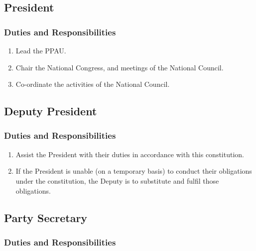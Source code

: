 \documentclass[a4paper,titlepage,8.5pt]{article}
\begin{document}
\subsection{President}

\subsubsection{Duties and Responsibilities}

\begin{enumerate}
\item Lead the PPAU.
\item Chair the National Congress, and meetings of the National Council.
\item Co-ordinate the activities of the National Council.
\end{enumerate}

\subsection{Deputy President}

\subsubsection{Duties and Responsibilities}

\begin{enumerate}
\item Assist the President with their duties in accordance with this constitution.
\item If the President is unable (on a temporary basis) to conduct their obligations under the constitution, the Deputy is to substitute and fulfil those obligations.
\end{enumerate}

\subsection{Party Secretary}

\subsubsection{Duties and Responsibilities}
\end{document}
